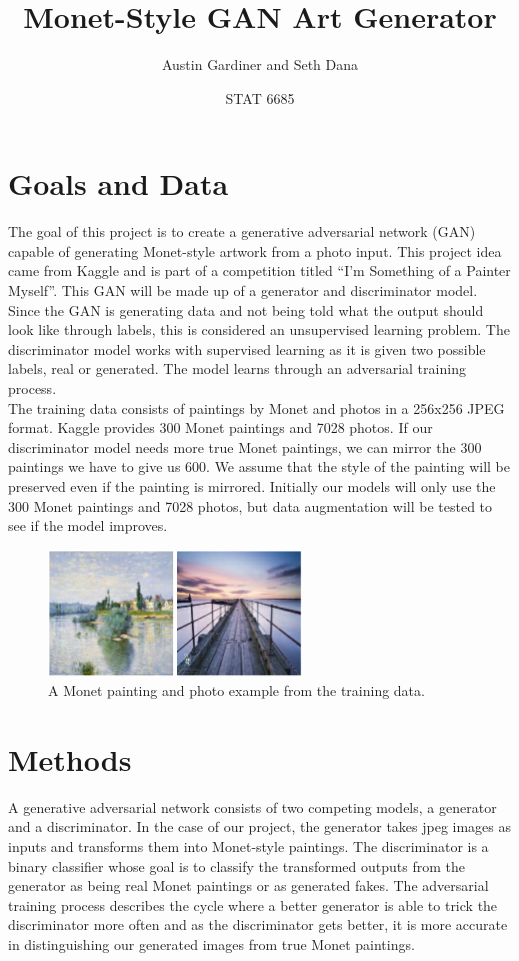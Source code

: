 \documentclass[11pt, letterpaper]{article}
\title{\vspace{-2.5cm}Monet-Style GAN Art Generator}
\author{Austin Gardiner and Seth Dana}
\date{STAT 6685}
\begin{document}
\maketitle


\section*{Goals and Data}
The goal of this project is to create a generative adversarial network (GAN) capable of generating Monet-style artwork from a photo input. This project idea came from Kaggle and is part of a competition titled “I’m Something of a Painter Myself”. This GAN will be made up of a generator and discriminator model. Since the GAN is generating data and not being told what the output should look like through labels, this is considered an unsupervised learning problem. The discriminator model works with supervised learning as it is given two possible labels, real or generated. The model learns through an adversarial training process. \\

The training data consists of paintings by Monet and photos in a 256x256 JPEG format. Kaggle provides 300 Monet paintings and 7028 photos. If our discriminator model needs more true Monet paintings, we can mirror the 300 paintings we have to give us 600. We assume that the style of the painting will be preserved even if the painting is mirrored. Initially our models will only use the 300 Monet paintings and 7028 photos, but data augmentation will be tested to see if the model improves. 

\begin{figure}[h] %
	\centering
	\includegraphics[width=0.6\textwidth]{data.png}
	\caption{A Monet painting and photo example from the training data.}
\end{figure}   

\section*{Methods}
A generative adversarial network consists of two competing models, a generator and a discriminator. In the case of our project, the generator takes jpeg images as inputs and transforms them into Monet-style paintings. The discriminator is a binary classifier whose goal is to classify the transformed outputs from the generator as being real Monet paintings or as generated fakes. The adversarial training process describes the cycle where a better generator is able to trick the discriminator more often and as the discriminator gets better, it is more accurate in distinguishing our generated images from true Monet paintings. \\
\end{document}
